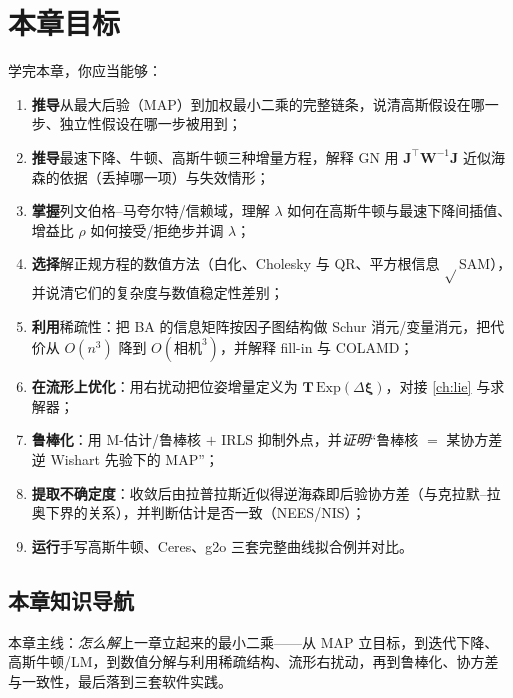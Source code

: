 \section*{本章目标}
学完本章，你应当能够：
\begin{enumerate}
  \item \textbf{推导}从最大后验（MAP）到加权最小二乘的完整链条，说清高斯假设在哪一步、独立性假设在哪一步被用到；
  \item \textbf{推导}最速下降、牛顿、高斯牛顿三种增量方程，解释 GN 用 $\mathbf{J}^\top\mathbf{W}^{-1}\mathbf{J}$ 近似海森的依据（丢掉哪一项）与失效情形；
  \item \textbf{掌握}列文伯格–马夸尔特/信赖域，理解 $\lambda$ 如何在高斯牛顿与最速下降间插值、增益比 $\rho$ 如何接受/拒绝步并调 $\lambda$；
  \item \textbf{选择}解正规方程的数值方法（白化、Cholesky 与 QR、平方根信息 $\sqrt{}$SAM），并说清它们的复杂度与数值稳定性差别；
  \item \textbf{利用}稀疏性：把 BA 的信息矩阵按因子图结构做 Schur 消元/变量消元，把代价从 $O(n^3)$ 降到 $O(\text{相机}^3)$，并解释 fill-in 与 COLAMD；
  \item \textbf{在流形上优化}：用右扰动把位姿增量定义为 $\mathbf{T}\,\mathrm{Exp}(\Delta\boldsymbol{\xi})$，对接 \cref{ch:lie} 与求解器；
  \item \textbf{鲁棒化}：用 M-估计/鲁棒核 $+$ IRLS 抑制外点，并\emph{证明}“鲁棒核 $=$ 某协方差逆 Wishart 先验下的 MAP”；
  \item \textbf{提取不确定度}：收敛后由拉普拉斯近似得逆海森即后验协方差（与克拉默–拉奥下界的关系），并判断估计是否一致（NEES/NIS）；
  \item \textbf{运行}手写高斯牛顿、Ceres、g2o 三套完整曲线拟合例并对比。
\end{enumerate}

\subsection*{本章知识导航}
本章主线：\emph{怎么解}上一章立起来的最小二乘——从 MAP 立目标，到迭代下降、高斯牛顿/LM，到数值分解与利用稀疏结构、流形右扰动，再到鲁棒化、协方差与一致性，最后落到三套软件实践。

